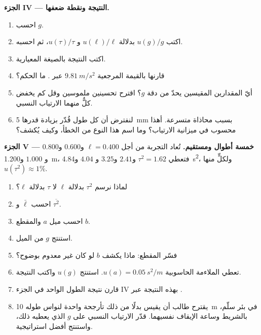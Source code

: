 \begin{problem}
\medskip
\noindent\textbf{الجزء IV --- النتيجة ونقطة ضعفها.}
\begin{enumerate}[resume]
  \item احسب $g$.
  \item اكتب $u(g)/g$ بدلالة $u(\ell)/\ell$ و $u(\tau)/\tau$،
        ثم احسبه.
  \item اكتب النتيجة بالصيغة المعيارية.
  \item قارنها بالقيمة المرجعية $\qty{9.81}{m/s^2}$ عبر . ما الحكم؟
  \item أيّ المقدارين المقيسين يحدّ من دقة $g$؟ اقترح تحسينين
        ملموسين وقل كم يخفض كلٌّ منهما الارتياب النسبي.
  \item لنفترض أن كل طول قُدّر بزيادة قدرها \qty{5}{mm} بسبب محاذاة
        متسرعة. أهذا محسوب في ميزانية الارتياب؟ وما اسم هذا النوع
        من الخطأ، وكيف يُكشف؟
\end{enumerate}

\medskip
\noindent\textbf{الجزء V --- خمسة أطوال ومستقيم.}
تُعاد التجربة من أجل $\ell = 0.400$ و$0.600$ و$0.800$ و
$1.000$ و\qty{1.200}{m}، فتعطي $\tau^2 = 1.62$ و$2.41$ و$3.25$ و
$4.04$ و\qty{4.84}{s^2}، ولكلٍّ منها $u(\tau^2) \approx 1\%$.
\begin{enumerate}[resume]
  \item لماذا نرسم $\tau^2$ بدلالة $\ell$ لا $\tau$ بدلالة
        $\ell$؟
  \item احسب $\bar\ell$ و $\overline{\tau^2}$.
  \item احسب ميل  $a$ والمقطع $b$.
  \item استنتج $g$ من الميل.
  \item فسّر المقطع: ماذا يكشف $b$ لو كان غير معدوم بوضوح؟
  \item تعطي الملاءمة الحاسوبية $u(a) = \qty{0.05}{s^2/m}$. استنتج
        $u(g)$ واكتب النتيجة.
  \item قارن نتيجة الطول الواحد في الجزء IV بهذه النتيجة عبر .
  \item يقترح طالب أن يقيس بدلًا من ذلك تأرجحة واحدة لنواس طوله
        \qty{10}{m} في بئر سلّم، بالشريط وساعة الإيقاف نفسيهما.
        قدّر الارتياب النسبي على $g$ الذي يعطيه ذلك، واستنتج أفضل
        استراتيجية.
\end{enumerate}
\end{problem}

